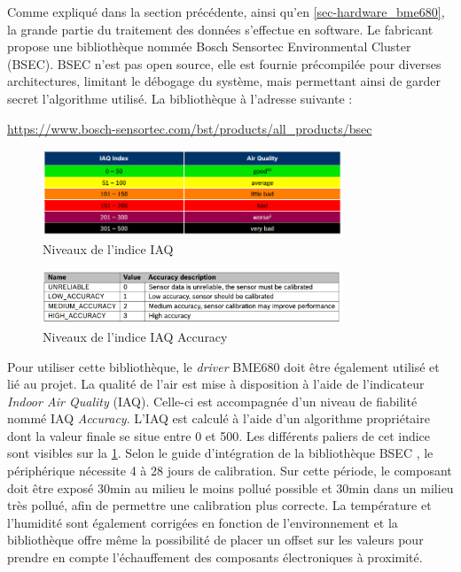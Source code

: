 Comme expliqué dans la section précédente, ainsi qu'en \cref{sec-hardware_bme680}, la grande partie du traitement des données s'effectue en software. Le fabricant propose une bibliothèque nommée Bosch Sensortec Environmental Cluster (BSEC). BSEC n'est pas open source, elle est fournie précompilée pour diverses architectures, limitant le débogage du système, mais permettant ainsi de garder secret l'algorithme utilisé. La bibliothèque à l'adresse suivante :

\begin{center}
    \url{https://www.bosch-sensortec.com/bst/products/all_products/bsec}
\end{center}


\begin{figure}[ht!]
    \centering
    \includegraphics[width=0.8\textwidth]{Figures/Software/kw41z/bme680_iaq_indexes.PNG}
    \caption{Niveaux de l'indice IAQ}
    \label{fig-bme680_iaq_indexes}
\end{figure}

\begin{figure}[ht!]
    \centering
    \includegraphics[width=0.8\textwidth]{Figures/Software/kw41z/iaq_accuracy.PNG}
    \caption{Niveaux de l'indice IAQ Accuracy}
    \label{fig-iaq_accuracy}
\end{figure}

Pour utiliser cette bibliothèque, le \textit{driver} BME680 doit être également utilisé et lié au projet. La qualité de l'air est mise à disposition à l'aide de l'indicateur \textit{Indoor Air Quality} (IAQ). Celle-ci est accompagnée d'un niveau de fiabilité nommé IAQ \textit{Accuracy}. L'IAQ est calculé à l'aide d'un algorithme propriétaire dont la valeur finale se situe entre 0 et 500. Les différents paliers de cet indice sont visibles sur la \cref{fig-bme680_iaq_indexes}. Selon le guide d'intégration de la bibliothèque BSEC \cite{BSEClib:online}, le périphérique nécessite 4 à 28 jours de calibration. Sur cette période, le composant doit être exposé 30min au milieu le moins pollué possible et 30min dans un milieu très pollué, afin de permettre une calibration plus correcte. La température et l'humidité sont également corrigées en fonction de l'environnement et la bibliothèque offre même la possibilité de placer un offset sur les valeurs pour prendre en compte l'échauffement des composants électroniques à proximité.



